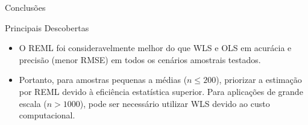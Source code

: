 \documentclass[10pt,aspectratio=169]{beamer}
\begin{document}
\begin{frame}{Conclusões}
  \begin{block}{Principais Descobertas}
    \begin{itemize}
      \item O REML foi consideravelmente melhor do que WLS e OLS em acurácia e precisão (menor RMSE) em todos os cenários amostrais testados.
      \item Portanto, para amostras pequenas a médias ($n \le 200$), priorizar a estimação por REML devido à eficiência estatística superior. Para aplicações de grande escala ($n > 1000$), pode ser necessário utilizar WLS devido ao custo computacional.
    \end{itemize}
  \end{block}
\end{frame}
\end{document}
